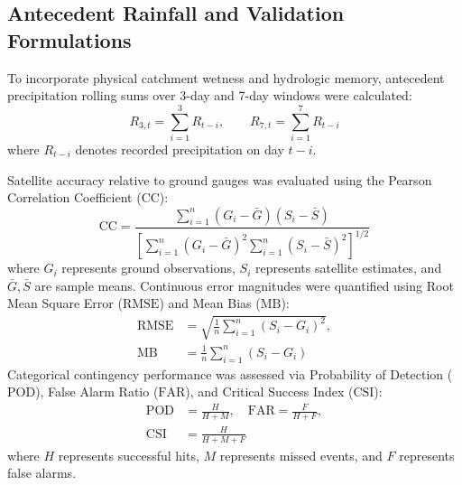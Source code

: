 \documentclass[conference]{IEEEtran}
\begin{document}
\subsection{Antecedent Rainfall and Validation Formulations}
To incorporate physical catchment wetness and hydrologic memory, antecedent precipitation rolling sums over 3-day and 7-day windows were calculated:
\begin{equation}
R_{3,t} = \sum_{i=1}^{3} R_{t-i}, \qquad R_{7,t} = \sum_{i=1}^{7} R_{t-i}
\label{eq:antecedent_lags}
\end{equation}
where $R_{t-i}$ denotes recorded precipitation on day $t-i$.

Satellite accuracy relative to ground gauges was evaluated using the Pearson Correlation Coefficient ($\text{CC}$):
\begin{equation}
\text{CC} = \frac{\sum_{i=1}^{n} (G_i - \bar{G})(S_i - \bar{S})}{\left[ \sum_{i=1}^{n} (G_i - \bar{G})^2 \sum_{i=1}^{n} (S_i - \bar{S})^2 \right]^{1/2}}
\label{eq:cc}
\end{equation}
where $G_i$ represents ground observations, $S_i$ represents satellite estimates, and $\bar{G}, \bar{S}$ are sample means. Continuous error magnitudes were quantified using Root Mean Square Error ($\text{RMSE}$) and Mean Bias ($\text{MB}$):
\begin{equation}
\begin{aligned}
\text{RMSE} &= \sqrt{\frac{1}{n} \sum_{i=1}^{n} (S_i - G_i)^2}, \\
\text{MB} &= \frac{1}{n} \sum_{i=1}^{n} (S_i - G_i)
\end{aligned}
\label{eq:rmse_mb}
\end{equation}
Categorical contingency performance was assessed via Probability of Detection ($\text{POD}$), False Alarm Ratio ($\text{FAR}$), and Critical Success Index ($\text{CSI}$):
\begin{equation}
\begin{aligned}
\text{POD} &= \frac{H}{H + M}, \quad \text{FAR} = \frac{F}{H + F}, \\
\text{CSI} &= \frac{H}{H + M + F}
\end{aligned}
\label{eq:pod_far_csi}
\end{equation}
where $H$ represents successful hits, $M$ represents missed events, and $F$ represents false alarms.
\end{document}
